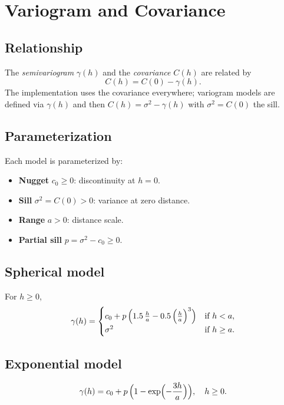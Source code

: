 \documentclass[11pt]{article}
\begin{document}
\section{Variogram and Covariance}

\subsection{Relationship}
The \emph{semivariogram} $\gamma(h)$ and the \emph{covariance} $C(h)$ are related by
\begin{equation}
  C(h) = C(0) - \gamma(h).
\end{equation}
The implementation uses the covariance everywhere; variogram models are defined via $\gamma(h)$ and then $C(h) = \sigma^2 - \gamma(h)$ with $\sigma^2 = C(0)$ the sill.

\subsection{Parameterization}
Each model is parameterized by:
\begin{itemize}
  \item \textbf{Nugget} $c_0 \ge 0$: discontinuity at $h=0$.
  \item \textbf{Sill} $\sigma^2 = C(0) > 0$: variance at zero distance.
  \item \textbf{Range} $a > 0$: distance scale.
  \item \textbf{Partial sill} $p = \sigma^2 - c_0 \ge 0$.
\end{itemize}

\subsection{Spherical model}
For $h \ge 0$,
\begin{equation}
  \gamma(h) =
  \begin{cases}
    c_0 + p\,\Bigl(1.5\,\frac{h}{a} - 0.5\,\Bigl(\frac{h}{a}\Bigr)^3\Bigr) & \text{if } h < a, \\
    \sigma^2 & \text{if } h \ge a.
  \end{cases}
\end{equation}

\subsection{Exponential model}
\begin{equation}
  \gamma(h) = c_0 + p\,\Bigl(1 - \exp\Bigl(-\frac{3h}{a}\Bigr)\Bigr), \quad h \ge 0.
\end{equation}
\end{document}
